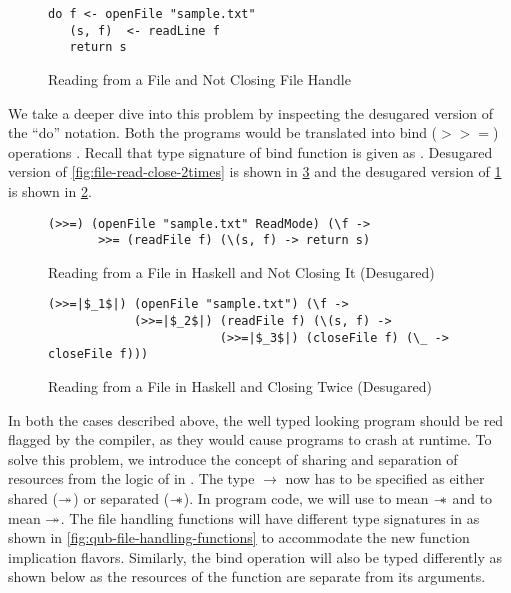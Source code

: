 \begin{figure}[h]
  \begin{framed}
    \begin{verbatim}
do f <- openFile "sample.txt"
   (s, f)  <- readLine f
   return s
    \end{verbatim}
  \end{framed}
  \caption{Reading from a File and Not Closing File Handle}
  \label{fig:file-read-noclose}
\end{figure}

We take a deeper dive into this problem by inspecting the desugared version of the ``do'' notation.
Both the programs would be translated into bind ($>>=$) operations . Recall that type signature of bind function is given as
. Desugared version of \cref{fig:file-read-close-2times}
is shown in \cref{fig:file-read-close-2times-desugared} and the desugared version of \cref{fig:file-read-noclose} is shown in \cref{fig:file-read-noclose-desugared}.

\begin{figure}[h]
\begin{framed}
\begin{verbatim}
(>>=) (openFile "sample.txt" ReadMode) (\f ->
       >>= (readFile f) (\(s, f) -> return s)
\end{verbatim}
  \end{framed}
  \caption{Reading from a File in Haskell and Not Closing It (Desugared)}
  \label{fig:file-read-noclose-desugared}
\end{figure}

\begin{figure}[h]
  \begin{framed}
    \begin{verbatim}
(>>=|$_1$|) (openFile "sample.txt") (\f ->
            (>>=|$_2$|) (readFile f) (\(s, f) ->
                        (>>=|$_3$|) (closeFile f) (\_ -> closeFile f)))
    \end{verbatim}
  \end{framed}
  \caption{Reading from a File in Haskell and Closing Twice (Desugared)}
  \label{fig:file-read-close-2times-desugared}
\end{figure}

In both the cases described above, the well typed looking program should be red flagged by the compiler, as they would
cause programs to crash at runtime. To solve this problem, we introduce the %
concept of sharing and separation of resources from the logic of \BI{} in \qub{}. The type $\rightarrow$ now
has to be specified as either shared ($\twoheadrightarrow$) or separated ($\mathrel{-\mkern-6mu*}$). In \qub{} program code, we will use
\HaskellF{-*>} to mean $\mathrel{-\mkern-6mu*}$ and \HaskellF{-&>} to mean $\twoheadrightarrow$.
The file handling functions will have different type signatures in \qub{} as shown in \cref{fig:qub-file-handling-functions} to accommodate
the new function implication flavors. Similarly, the bind operation will also be typed differently as shown below as the resources of the function are
separate from its arguments.

